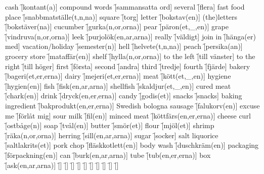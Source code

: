 \begin{questions}
\begin{multicols}{2}
        \question cash \f[kontant(a)]
        \question compound words \f[sammansatta ord]
        \question several \f[flera]
        \question fast food place \f[snabbmatställe(t,n,na)]
        \question square \f[torg]
        \question letter \f[bokstav(en)]
        \question (the)letters \f[bokstäver(na)]
        \question cucumber \f[gurka(n,or,orna)]
        \question pear \f[päron(et,\_,en)]
        \question grape \f[vindruva(n,or,orna)]
        \question leek \f[purjolök(en,ar,arna)]
        \question really \f[väldigt]
        \question join in \f[hänga(er) med]
        \question vacation/holiday \f[semester(n)]
        \question hell \f[helvete(t,n,na)]
        \question peach \f[persika(an)]
        \question grocery store \f[mataffär(en)]
        \question shelf \f[hylla(n,or,orna)]
        \question to the left \f[till vänster]
        \question to the right \f[till höger]
        \question first \f[första]
        \question second \f[andra]
        \question third \f[tredje]
        \question fourth \f[fjärde]
        \question bakery \f[bageri(et,er,erna)]
        \question dairy \f[mejeri(et,er,erna)]
        \question meat \f[kött(et,\_,en)]
        \question hygiene \f[hygien(en)]
        \question fish \f[fisk(en,ar,arna)]
        \question shellfish \f[skaldjur(et,\_,en)]
        \question cured meat \f[chark(en)]
        \question drink \f[dryck(en,er,erna)]
        \question candy \f[godis(et)]
        \question snacks \f[snacks]
        \question baking ingredient \f[bakprodukt(en,er,erna)]
        \question Swedish bologna sausage \f[falukorv(en)]
        \question excuse me \f[förlåt mig]
        \question sour milk \f[fil(en)]
        \question minced meat \f[köttfärs(en,er,erna)]
        \question cheese curl \f[ostbåge(n)]
        \question soap \f[tvål(en)]
        \question butter \f[smör(et)]
        \question flour \f[mjöl(et)]
        \question shrimp \f[räka(n,or,orna)]
        \question herring \f[sill(en,ar,arna)]
        \question sugar \f[socker]
        \question salt liquorice \f[saltlakrits(et)]
        \question pork chop \f[fläskkotlett(en)]
        \question body wash \f[duschkräm(en)]
        \question packaging \f[förpackning(en)]
        \question can \f[burk(en,ar,arna)]
        \question tube \f[tub(en,er,erna)]
        \question box \f[ask(en,ar,arna)]
        \question  \f[]
        \question  \f[]
        \question  \f[]
        \question  \f[]
        \question  \f[]
        \question  \f[]
        \question  \f[]
        \question  \f[]
        \question  \f[]
        \question  \f[]
    \end{multicols}
\end{questions}
